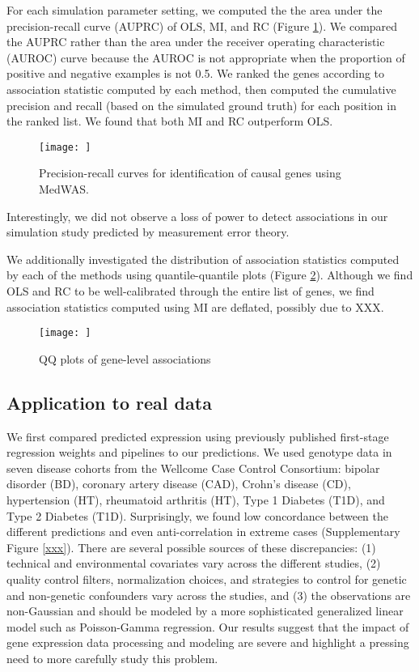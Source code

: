 \documentclass{article}
\begin{document}
For each simulation parameter setting, we computed the the area under the
precision-recall curve (AUPRC) of OLS, MI, and RC (Figure \ref{auprc}). We
compared the AUPRC rather than the area under the receiver operating
characteristic (AUROC) curve because the AUROC is not appropriate when the
proportion of positive and negative examples is not 0.5. We ranked the genes
according to association statistic computed by each method, then computed the
cumulative precision and recall (based on the simulated ground truth) for each
position in the ranked list. We found that both MI and RC outperform OLS.

\begin{figure}[p!]
    \centering \texttt{[image: ]}
    \caption{Precision-recall curves for identification of causal genes using
      MedWAS.}
    \label{auprc}
\end{figure}

Interestingly, we did not observe a loss of power to detect associations in our
simulation study predicted by measurement error theory.

We additionally investigated the distribution of association statistics
computed by each of the methods using quantile-quantile plots (Figure
\ref{qqplot}). Although we find OLS and RC to be well-calibrated through the
entire list of genes, we find association statistics computed using MI are
deflated, possibly due to XXX.

\begin{figure}[p!]
    \centering \texttt{[image: ]}
    \caption{QQ plots of gene-level associations}
    \label{qqplot}
\end{figure}

\subsection{Application to real data}

We first compared predicted expression using previously published first-stage
regression weights and pipelines to our
predictions\cite{10.1038/ng.3367,10.1038/ng.3506}. We used genotype data in
seven disease cohorts from the Wellcome Case Control
Consortium\cite{10.1038/nature05911}: bipolar disorder (BD), coronary artery
disease (CAD), Crohn's disease (CD), hypertension (HT), rheumatoid arthritis
(HT), Type 1 Diabetes (T1D), and Type 2 Diabetes (T1D). Surprisingly, we found
low concordance between the different predictions and even anti-correlation in
extreme cases (Supplementary Figure \ref{xxx}). There are several possible
sources of these discrepancies: (1) technical and environmental covariates vary
across the different studies, (2) quality control filters, normalization
choices, and strategies to control for genetic and non-genetic confounders vary
across the studies, and (3) the observations are non-Gaussian and should be
modeled by a more sophisticated generalized linear model such as Poisson-Gamma
regression. Our results suggest that the impact of gene expression data
processing and modeling are severe and highlight a pressing need to more
carefully study this problem.
\end{document}
